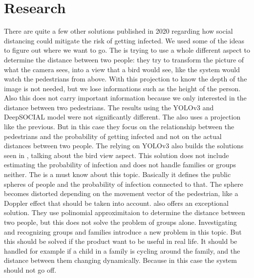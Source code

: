 \chapter{Research}
There are quite a few other solutions published in 2020 regarding how social distancing could mitigate the risk of getting infected.
We used some of the ideas to figure out where we want to go. The \cite{deepsocial} is trying to use a whole different aspect to
determine the distance between two people: they try to transform the picture of what the camera sees, into a view that a bird would
see, like the system would watch the pedestrians from above. With this projection to know the depth of the image is not needed, but
we lose informations such as the height of the person. Also this does not carry important information because we only interested in
the distance between two pedestrians. The results using the YOLOv3 and DeepSOCIAL model were not significantly different. The \cite{visbased}
also uses a projection like the previous. But in this case they focus on the relationship between the pedestrians and the probability
of getting infected and not on the actual distances between two people. The \cite{socdist} relying on YOLOv3 also builds the solutions
seen in \cite{deepsocial}, talking about the bird view aspect. This solution does not include estimating the probability of infection
and does not handle families or groups neither. The \cite{vissoc} is a must know about this topic. Basically it defines the public spheres
of people and the probability of infection connected to that. The sphere becomes distorted depending on the movement vector of the pedestrian, 
like a Doppler effect that should be taken into account. \cite{8717277} also offers an exceptional solution. They use polinomial approximitaion
to determine the distance between two people, but this does not solve the problem of groups alone. Investigating and recognizing groups and
families introduce a new problem in this topic. But this should be solved if the product want to be useful in real life. It should be handled for
example if a child in a family is cycling around the family, and the distance between them changing dynamically. Because in this case the system should
not go off.
